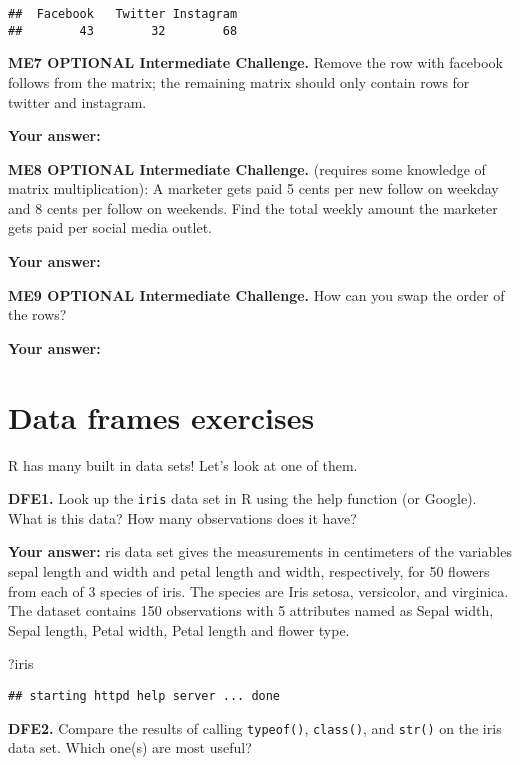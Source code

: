 \documentclass[
]{article}
\newenvironment{Shaded}{\begin{snugshade}}{\end{snugshade}}
\newcommand{\NormalTok}[1]{#1}
\begin{document}
\begin{verbatim}
##  Facebook   Twitter Instagram 
##        43        32        68
\end{verbatim}

\textbf{ME7 OPTIONAL Intermediate Challenge.} Remove the row with
facebook follows from the matrix; the remaining matrix should only
contain rows for twitter and instagram.

\textbf{Your answer:}

\textbf{ME8 OPTIONAL Intermediate Challenge.} (requires some knowledge
of matrix multiplication): A marketer gets paid 5 cents per new follow
on weekday and 8 cents per follow on weekends. Find the total weekly
amount the marketer gets paid per social media outlet.

\textbf{Your answer:}

\textbf{ME9 OPTIONAL Intermediate Challenge.} How can you swap the order
of the rows?

\textbf{Your answer:}

\hypertarget{data-frames-exercises}{%
\section{Data frames exercises}\label{data-frames-exercises}}

R has many built in data sets! Let's look at one of them.

\textbf{DFE1.} Look up the \texttt{iris} data set in R using the help
function (or Google). What is this data? How many observations does it
have?

\textbf{Your answer:} ris data set gives the measurements in centimeters
of the variables sepal length and width and petal length and width,
respectively, for 50 flowers from each of 3 species of iris. The species
are Iris setosa, versicolor, and virginica. The dataset contains 150
observations with 5 attributes named as Sepal width, Sepal length, Petal
width, Petal length and flower type.

\begin{Shaded}
\begin{Highlighting}[]
\NormalTok{?iris}
\end{Highlighting}
\end{Shaded}

\begin{verbatim}
## starting httpd help server ... done
\end{verbatim}

\textbf{DFE2.} Compare the results of calling \texttt{typeof()},
\texttt{class()}, and \texttt{str()} on the iris data set. Which one(s)
are most useful?
\end{document}
